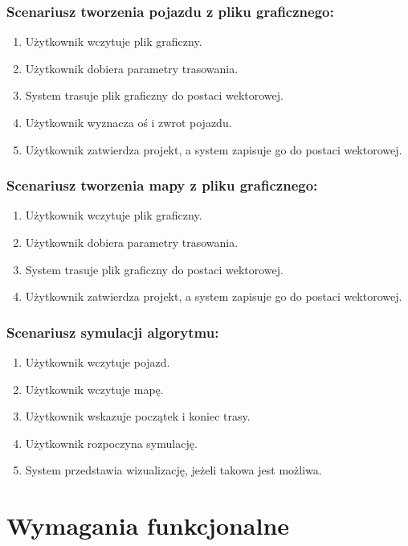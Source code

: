 \documentclass{article}
\let\oldsection\section
\renewcommand\section{\clearpage\oldsection} %
\begin{document}
\subsubsection{Scenariusz tworzenia pojazdu z pliku graficznego:}
\begin{enumerate}
  \item Użytkownik wczytuje plik graficzny.
  \item Użytkownik dobiera parametry trasowania.
  \item System trasuje plik graficzny do postaci wektorowej.
  \item Użytkownik wyznacza oś i zwrot pojazdu.
  \item Użytkownik zatwierdza projekt, a system zapisuje go do postaci wektorowej.
\end{enumerate}

\subsubsection{Scenariusz tworzenia mapy z pliku graficznego:}
\begin{enumerate}
  \item Użytkownik wczytuje plik graficzny.
  \item Użytkownik dobiera parametry trasowania.
  \item System trasuje plik graficzny do postaci wektorowej.
  \item Użytkownik zatwierdza projekt, a system zapisuje go do postaci wektorowej.
\end{enumerate}

\subsubsection{Scenariusz symulacji algorytmu:}
\begin{enumerate}
  \item Użytkownik wczytuje pojazd.
  \item Użytkownik wczytuje mapę.
  \item Użytkownik wskazuje początek i koniec trasy.
  \item Użytkownik rozpoczyna symulację.
  \item System przedstawia wizualizację, jeżeli takowa jest możliwa.
\end{enumerate}


\section{Wymagania funkcjonalne}
\end{document}
